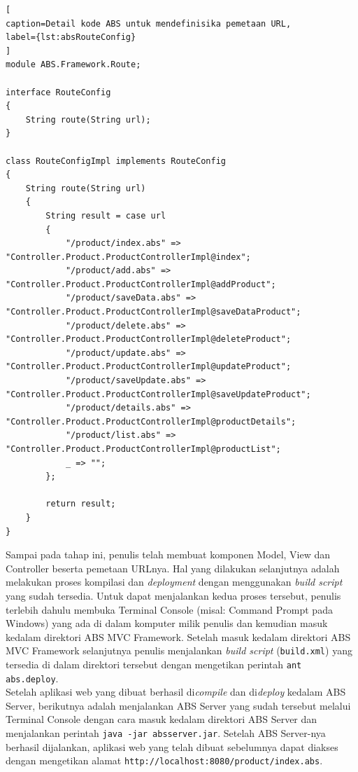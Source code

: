\begin{lstlisting}[
caption=Detail kode ABS untuk mendefinisika pemetaan URL,
label={lst:absRouteConfig}
]
module ABS.Framework.Route;

interface RouteConfig
{
	String route(String url);
}

class RouteConfigImpl implements RouteConfig
{
	String route(String url)
	{
		String result = case url
		{
			"/product/index.abs" => "Controller.Product.ProductControllerImpl@index";
			"/product/add.abs" => "Controller.Product.ProductControllerImpl@addProduct";
			"/product/saveData.abs" => "Controller.Product.ProductControllerImpl@saveDataProduct";
			"/product/delete.abs" => "Controller.Product.ProductControllerImpl@deleteProduct";
			"/product/update.abs" => "Controller.Product.ProductControllerImpl@updateProduct";
			"/product/saveUpdate.abs" => "Controller.Product.ProductControllerImpl@saveUpdateProduct";
			"/product/details.abs" => "Controller.Product.ProductControllerImpl@productDetails";
			"/product/list.abs" => "Controller.Product.ProductControllerImpl@productList";
			_ => "";
		};
		
		return result;
	}
}
\end{lstlisting}

Sampai pada tahap ini, penulis telah membuat komponen Model, View dan Controller beserta pemetaan URLnya. Hal yang dilakukan selanjutnya adalah melakukan proses kompilasi dan \textit{deployment} dengan menggunakan \textit{build script} yang sudah tersedia. Untuk dapat menjalankan kedua proses tersebut, penulis terlebih dahulu membuka Terminal Console (misal: Command Prompt pada Windows) yang ada di dalam komputer milik penulis dan kemudian masuk kedalam direktori ABS MVC Framework. Setelah masuk kedalam direktori ABS MVC Framework selanjutnya penulis menjalankan \textit{build script} (\texttt{build.xml}) yang tersedia di dalam direktori tersebut dengan mengetikan perintah \texttt{ant abs.deploy}.\\

Setelah aplikasi web yang dibuat berhasil di\textit{compile} dan di\textit{deploy} kedalam ABS Server, berikutnya adalah menjalankan ABS Server yang sudah tersebut melalui Terminal Console dengan cara masuk kedalam direktori ABS Server dan menjalankan perintah \texttt{java -jar absserver.jar}. Setelah ABS Server-nya berhasil dijalankan, aplikasi web yang telah dibuat sebelumnya dapat diakses dengan mengetikan alamat \texttt{http://localhost:8080/product/index.abs}.


